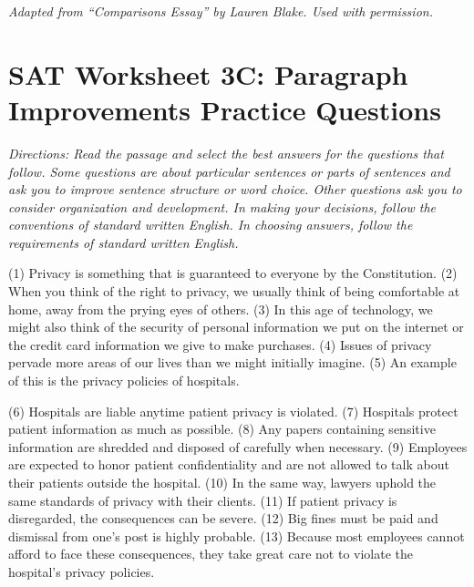 \documentclass[12pt]{book}
\renewcommand{\indent}{\hspace{1cm}}
\begin{document}
\begin{spacing}{2}
\begin{linenumbers*}
\end{linenumbers*}
\end{spacing}

\bigskip
\textit{Adapted from ``Comparisons Essay'' by Lauren Blake. Used with permission.}

\vfill
\newpage
\section[Improvement Practice]{SAT Worksheet 3C: Paragraph Improvements Practice Questions}

\bigskip
\textit{Directions: Read the passage and select the best answers for the questions that follow. Some questions are about particular sentences or parts of sentences and ask you to improve sentence structure or word choice. Other questions ask you to consider organization and development. In making your decisions, follow the conventions of standard written English. In choosing answers, follow the requirements of standard written English.}

\bigskip
\indent (1) Privacy is something that is guaranteed to everyone by the Constitution. (2) When you think of the right to privacy, we usually think of being comfortable at home, away from the prying eyes of others. (3) In this age of technology, we might also think of the security of personal information we put on the internet or the credit card information we give to make purchases. (4) Issues of privacy pervade more areas of our lives than we might initially imagine. (5) An example of this is the privacy policies of hospitals.

\indent (6) Hospitals are liable anytime patient privacy is violated. (7) Hospitals protect patient information as much as possible. (8) Any papers containing sensitive information are shredded and disposed of carefully when necessary. (9) Employees are expected to honor patient confidentiality and are not allowed to talk about their patients outside the hospital. (10) In the same way, lawyers uphold the same standards of privacy with their clients. (11) If patient privacy is disregarded, the consequences can be severe. (12) Big fines must be paid and dismissal from one's post is highly probable. (13) Because most employees cannot afford to face these consequences, they take great care not to violate the hospital's privacy policies.
\end{document}

